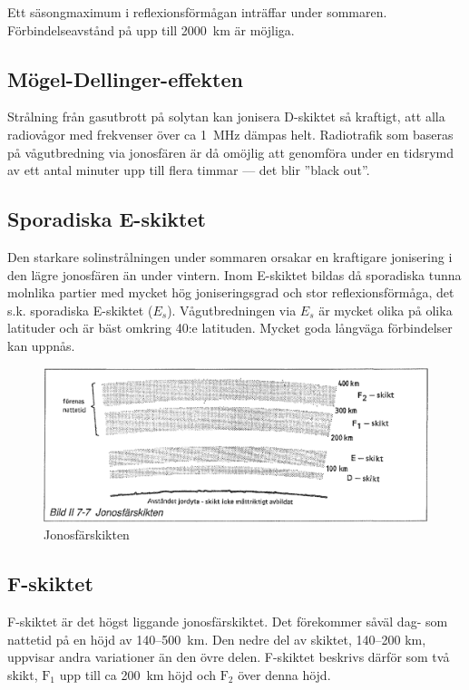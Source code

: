 Ett säsongmaximum i reflexionsförmågan inträffar under
sommaren. Förbindelseavstånd på upp till 2000~km är möjliga.

\subsection{Mögel-Dellinger-effekten}

Strålning från gasutbrott på solytan kan jonisera D-skiktet så
kraftigt, att alla radiovågor med frekvenser över ca 1~MHz dämpas
helt.  Radiotrafik som baseras på vågutbredning via jonosfären är då
omöjlig att genomföra under en tidsrymd av ett antal minuter upp till
flera timmar --- det blir ''black out''.

\subsection{Sporadiska E-skiktet}

Den starkare solinstrålningen under sommaren orsakar en kraftigare
jonisering i den lägre jonosfären än under vintern. Inom E-skiktet
bildas då sporadiska tunna molnlika partier med mycket hög
joniseringsgrad och stor reflexionsförmåga, det s.k. sporadiska
E-skiktet (\(E_s\)). Vågutbredningen via \(E_s\) är mycket olika på
olika latituder och är bäst omkring 40:e latituden. Mycket goda långväga
förbindelser kan uppnås.

\begin{figure}
  \includegraphics[width=\textwidth]{images/bild_2_7-07}
  \caption{Jonosfärskikten}
  \label{fig:bildII7-7}
\end{figure}

\subsection{F-skiktet}

F-skiktet är det högst liggande jonosfärskiktet. Det förekommer såväl
dag- som nattetid på en höjd av 140--500~km. Den nedre del av skiktet,
140--200 km, uppvisar andra variationer än den övre delen. F-skiktet
beskrivs därför som två skikt, \(\mathrm{F_1}\) upp till ca 200~km
höjd och \(\mathrm{F_2}\) över denna höjd.

